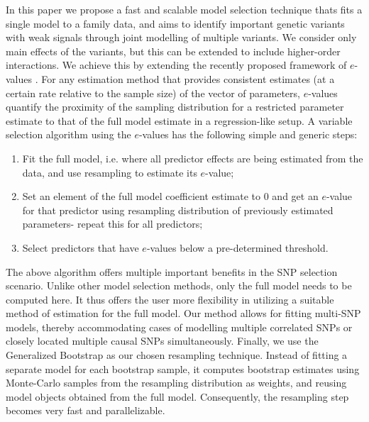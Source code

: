 In this paper we propose a fast and scalable model selection technique thats fits a single model to a family data, and aims to identify important genetic variants with weak signals through joint modelling of multiple variants. We consider only main effects of the variants, but this can be extended to include higher-order interactions. We achieve this by extending the recently proposed framework of $e$-values \citep{MajumdarChatterjee17}. For any estimation method that provides consistent estimates (at a certain rate relative to the sample size) of the vector of parameters, $e$-values quantify the proximity of the sampling distribution for a restricted parameter estimate to that of the full model estimate in a regression-like setup. A variable selection algorithm using the $e$-values has the following simple and generic steps:
%
\begin{enumerate}
\item Fit the full model, i.e. where all predictor effects are being estimated from the data, and use resampling to estimate its $e$-value;

\item Set an element of the full model coefficient estimate to 0 and get an $e$-value for that predictor using resampling distribution of previously estimated parameters- repeat this for all predictors;

\item Select predictors that have $e$-values below a pre-determined threshold.
\end{enumerate}

The above algorithm offers multiple important benefits in the SNP selection scenario. Unlike other model selection methods, only the full model needs to be computed here. It thus offers the user more flexibility in utilizing a suitable method of estimation for the full model. Our method allows for fitting multi-SNP models, thereby accommodating cases of modelling multiple correlated SNPs or closely located multiple causal SNPs simultaneously. Finally, we use the Generalized Bootstrap \citep{ChatterjeeBose05} as our chosen resampling technique. Instead of fitting a separate model for each bootstrap sample, it computes bootstrap estimates using Monte-Carlo samples from the resampling distribution as weights, and reusing model objects obtained from the full model. Consequently, the resampling step becomes very fast and parallelizable.

